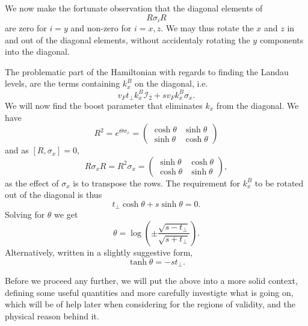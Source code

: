 We now make the fortunate observation that the diagonal elements of
\[
  R \sigma_{i} R
\]
are zero for $i=y$ and non-zero for \(i=x,z\).
We may thus rotate the \(x\) and \(z\) in and out of the diagonal elements, without accidentaly rotating the \(y\) components into the diagonal.

The problematic part of the Hamiltonian with regards to finding the Landau levels, are the terms containing \(k^B_{x}\) on the diagonal, i.e.
\[
  v_F t_{\perp} k^B_{x} \mathcal{I}_{2} + s v_{F} k^B_{x} \sigma _{x}.
\]
We will now find the boost parameter that eliminates \(k_{x}\) from the diagonal.
We have
\begin{equation}
  \label{eq:45}
  R^{2} = e^{\Theta \sigma _{x} } =
  \begin{pmatrix}
    \cosh \theta & \sinh \theta \\
    \sinh \theta & \cosh \theta
  \end{pmatrix}
\end{equation}
and as $[R, \sigma_{x}] = 0$,
\begin{equation}
  \label{eq:46}
  R \sigma _{x} R =  R^{2} \sigma _{x} =
  \begin{pmatrix}
    \sinh \theta & \cosh \theta \\
    \cosh \theta & \sinh \theta
  \end{pmatrix},
\end{equation}
as the effect of \(\sigma _{x}\) is to transpose the rows.
The requirement for \(k^B_{x}\) to be rotated out of the diagonal is thus
\begin{equation}
  \label{eq:47}
  t_{\perp} \cosh \theta + s \sinh \theta = 0.
\end{equation}
Solving for \(\theta \) we get
\begin{equation}
  \label{eq:48}
  \theta = \log (
  \pm \frac{\sqrt{s - t_{\perp}}}{\sqrt{s + t_{\perp}}}
  ).
\end{equation}
Alternatively, written in a slightly suggestive form,
\begin{equation}
  \label{eq:49}
  \tanh \theta =
  - s t_{\perp}.
\end{equation}

Before we proceed any further, we will put the above into a more solid context, defining some useful quantities and more carefully investigte what is going on, which will be of help later when considering for the regions of validity, and the physical reason behind it.

